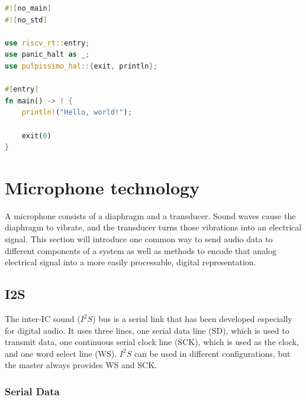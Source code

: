 \begin{lstlisting}[style=colorEX,language=Rust,caption={Minimal example of a program running on the pulpissimo hardware},label={code:min_example}]
#![no_main]
#![no_std]

use riscv_rt::entry;
use panic_halt as _;
use pulpissimo_hal::{exit, println};

#[entry]
fn main() -> ! {
    println!("Hello, world!");

    exit(0)
}
\end{lstlisting}


\section{Microphone technology}

A microphone consists of a diaphragm and a transducer.
Sound waves cause the diaphragm to vibrate, and
the transducer turns those vibrations into an electrical signal.
This section will introduce one common way to send audio data to different
components of a system as well as methods to encode that analog electrical
signal into a more easily processable, digital representation.

\subsection{I2S}

The inter-IC sound ($I^2S$) \cite{i2s} bus is a serial link that has been developed especially for digital audio.
It uses three lines, one serial data line (SD), which is used to transmit data, one continuous serial clock line (SCK),
which is used as the clock, and one word select line (WS).
$I^2S$ can be used in different configurations, but the master always provides WS and SCK.

\subsubsection{Serial Data}

